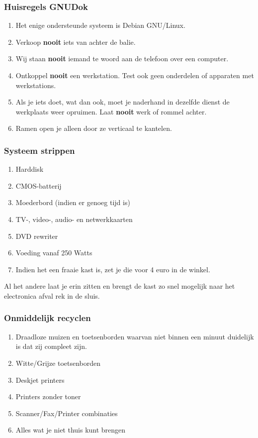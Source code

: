 \documentclass{beamer}
\begin{document}
\begin{frame}
	\frametitle{Huisregels GNUDok}
	\begin{enumerate}
		\item{Het enige ondersteunde systeem is Debian GNU/Linux.}
		\item{Verkoop \textbf{nooit} iets van achter de balie.}
		\item{Wij staan \textbf{nooit} iemand te woord aan de telefoon over een computer.}
		\item{Ontkoppel \textbf{nooit} een werkstation. Test ook geen onderdelen of apparaten met werkstations.}
		\item{Als je iets doet, wat dan ook, moet je naderhand in dezelfde dienst de werkplaats weer opruimen. Laat \textbf{nooit} werk of rommel achter.}
		\item{Ramen open je alleen door ze verticaal te kantelen.}
	\end{enumerate}
\end{frame}

\begin{frame}
	\frametitle{Systeem strippen}
	\begin{enumerate}
		\item{Harddisk}
		\item{CMOS-batterij}
		\item{Moederbord (indien er genoeg tijd is)}
		\item{TV-, video-, audio- en netwerkkaarten}
		\item{DVD rewriter}
		\item{Voeding vanaf 250 Watts}
		\item{Indien het een fraaie kast is, zet je die voor 4 euro in de winkel.}
	\end{enumerate}
	Al het andere laat je erin zitten en brengt de kast zo snel mogelijk naar het electronica afval rek in de sluis. 
\end{frame}

\begin{frame}
	\frametitle{Onmiddelijk recyclen}
	\begin{enumerate}
		\item{Draadloze muizen en toetsenborden waarvan niet binnen een minuut duidelijk is dat zij compleet zijn.}
		\item{Witte/Grijze toetsenborden}
		\item{Deskjet printers}
		\item{Printers zonder toner}
		\item{Scanner/Fax/Printer combinaties}
		\item{Alles wat je niet thuis kunt brengen}
	\end{enumerate}
\end{frame}
\end{document}

